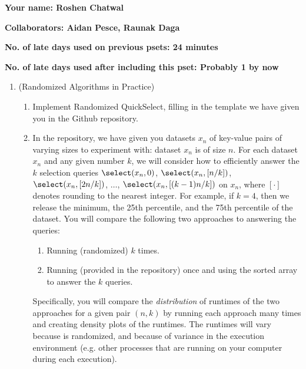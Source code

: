\documentclass[11pt]{article}
\begin{document}

\textbf{Your name: Roshen Chatwal}

\textbf{Collaborators: Aidan Pesce, Raunak Daga }

\textbf{No. of late days used on previous psets: 24 minutes}

\textbf{No. of late days used after including this pset: Probably 1 by now }

\begin{enumerate}
    \item (Randomized Algorithms in Practice)  
    \begin{enumerate}
        \item Implement Randomized QuickSelect, filling in the template we have given you in the Github repository.
        
        \item 
        In the repository, we have given you datasets $x_n$ of key-value pairs of varying sizes to experiment with: dataset $x_n$ is of size $n$.  For each dataset $x_n$ and any given number $k$, we will consider how to efficiently answer the $k$ selection queries
        $\select(x_n,0)$, $\select(x_n,[n/k])$, $\select(x_n,[2n/k])$, $\ldots$, $\select(x_n,[(k-1)n/k])$ on $x_n$, where $[\cdot]$ denotes rounding to the nearest integer. For example, if $k=4$, then we release the minimum, the 25th percentile, and the 75th percentile of the dataset.  You will compare the following two approaches to answering the queries:
        
        \begin{enumerate}
            \item Running (randomized) \QuickSelect{} $k$ times.
            \item Running \MergeSort{} (provided in the repository) once and using the sorted array to answer the $k$ queries.
        \end{enumerate}
        Specifically, you will compare the {\em distribution} of runtimes of the two approaches for a given pair $(n,k)$ by running each approach many times and creating density plots of the runtimes.  The runtimes will vary because \QuickSelect{}  is randomized, and because of variance in the execution environment (e.g. other processes that are running on your computer during each execution). \vspace{1.5mm}
        

\end{enumerate}
\end{enumerate}
\end{document}
